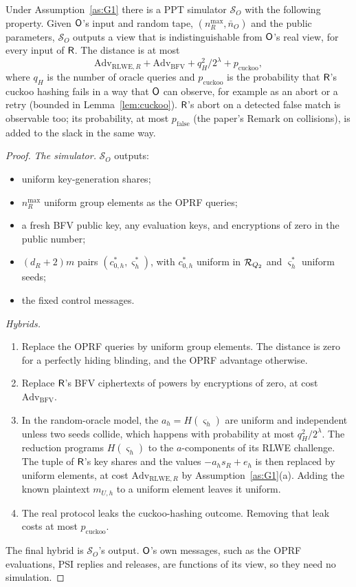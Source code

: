 \begin{theorem}\label{thm:G1}
Under Assumption~\ref{as:G1} there is a PPT simulator $\mathcal S_O$ with the following property. Given $\mathsf{O}$'s input and random tape, $(n_R^{\max},\bar n_O)$ and the public parameters, $\mathcal S_O$ outputs a view that is indistinguishable from $\mathsf{O}$'s real view, for every input of $\mathsf{R}$. The distance is at most
\[
  \mathrm{Adv}_{\mathrm{RLWE},R}+\mathrm{Adv}_{\mathrm{BFV}}+q_H^2/2^{\lambda}+p_{\mathrm{cuckoo}},
\]
where $q_H$ is the number of oracle queries and $p_{\mathrm{cuckoo}}$ is the probability that $\mathsf{R}$'s cuckoo hashing fails in a way that $\mathsf{O}$ can observe, for example as an abort or a retry (bounded in Lemma~\ref{lem:cuckoo}). $\mathsf{R}$'s abort on a detected false match is observable too; its probability, at most $p_{\mathrm{false}}$ (the paper's Remark on collisions), is added to the slack in the same way.
\end{theorem}
\begin{proof}
\emph{The simulator.} $\mathcal S_O$ outputs:
\begin{itemize}[nosep]
  \item uniform key-generation shares;
  \item $n_R^{\max}$ uniform group elements as the OPRF queries;
  \item a fresh BFV public key, any evaluation keys, and encryptions of zero in the public number;
  \item $(d_R+2)m$ pairs $(c^*_{0,h},\varsigma^*_h)$, with $c^*_{0,h}$ uniform in $\mathcal{R}_{Q_2}$ and $\varsigma^*_h$ uniform seeds;
  \item the fixed control messages.
\end{itemize}

\emph{Hybrids.}
\begin{enumerate}[nosep]
  \item Replace the OPRF queries by uniform group elements. The distance is zero for a perfectly hiding blinding, and the OPRF advantage otherwise.
  \item Replace $\mathsf{R}$'s BFV ciphertexts of powers by encryptions of zero, at cost $\mathrm{Adv}_{\mathrm{BFV}}$.
  \item In the random-oracle model, the $a_h=H(\varsigma_h)$ are uniform and independent unless two seeds collide, which happens with probability at most $q_H^2/2^\lambda$. The reduction programs $H(\varsigma_h)$ to the $a$-components of its RLWE challenge. The tuple of $\mathsf{R}$'s key shares and the values $-a_hs_R+e_h$ is then replaced by uniform elements, at cost $\mathrm{Adv}_{\mathrm{RLWE},R}$ by Assumption~\ref{as:G1}(a). Adding the known plaintext $m_{U,h}$ to a uniform element leaves it uniform.
  \item The real protocol leaks the cuckoo-hashing outcome. Removing that leak costs at most $p_{\mathrm{cuckoo}}$.
\end{enumerate}
The final hybrid is $\mathcal S_O$'s output. $\mathsf{O}$'s own messages, such as the OPRF evaluations, PSI replies and releases, are functions of its view, so they need no simulation.
\end{proof}

